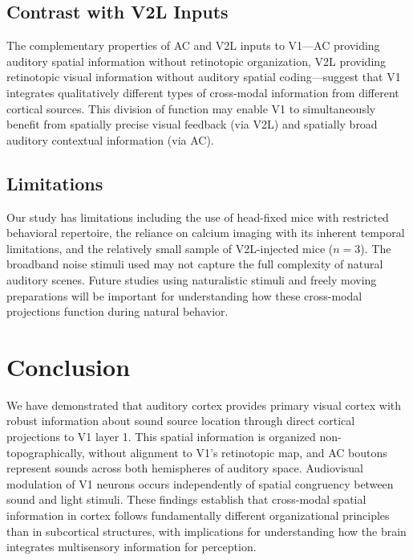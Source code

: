 \documentclass[11pt]{article}
\begin{document}
\subsection{Contrast with V2L Inputs}

The complementary properties of AC and V2L inputs to V1---AC providing auditory spatial information without retinotopic organization, V2L providing retinotopic visual information without auditory spatial coding---suggest that V1 integrates qualitatively different types of cross-modal information from different cortical sources. This division of function may enable V1 to simultaneously benefit from spatially precise visual feedback (via V2L) and spatially broad auditory contextual information (via AC).

\subsection{Limitations}

Our study has limitations including the use of head-fixed mice with restricted behavioral repertoire, the reliance on calcium imaging with its inherent temporal limitations, and the relatively small sample of V2L-injected mice ($n = 3$). The broadband noise stimuli used may not capture the full complexity of natural auditory scenes. Future studies using naturalistic stimuli and freely moving preparations will be important for understanding how these cross-modal projections function during natural behavior.

\section{Conclusion}

We have demonstrated that auditory cortex provides primary visual cortex with robust information about sound source location through direct cortical projections to V1 layer 1. This spatial information is organized non-topographically, without alignment to V1's retinotopic map, and AC boutons represent sounds across both hemispheres of auditory space. Audiovisual modulation of V1 neurons occurs independently of spatial congruency between sound and light stimuli. These findings establish that cross-modal spatial information in cortex follows fundamentally different organizational principles than in subcortical structures, with implications for understanding how the brain integrates multisensory information for perception.



\end{document}
